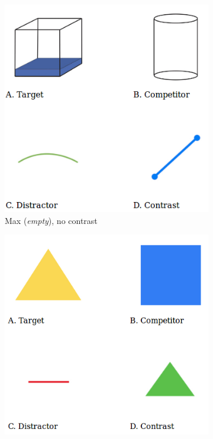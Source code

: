\documentclass[10pt,letterpaper]{article}
\begin{document}
\begin{figure}[ht]
\begin{subfigure}[b]{0.2\textwidth}
    \includegraphics[width=\textwidth]{plots/scene15nc.png}
    \caption{Max (\emph{empty}), no contrast}
    \label{fig:maxnocontrast}
  \end{subfigure}
  \qquad
  \begin{subfigure}[b]{0.2\textwidth}
    \includegraphics[width=\textwidth]{plots/scene33c.png}

\end{subfigure}
\end{figure}
\end{document}
